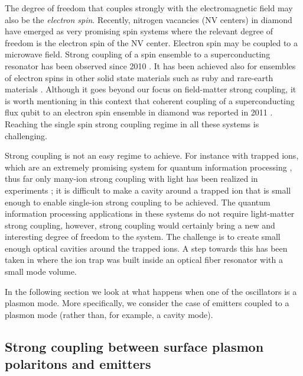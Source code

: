 \documentclass[12pt]{iopart}
\begin{document}
The degree of freedom that couples strongly with the electromagnetic field may also be the {\it electron spin}. Recently, nitrogen vacancies (NV centers) in diamond have emerged as very promising spin systems where the relevant degree of freedom is the electron spin of the NV center. Electron spin may be coupled to a microwave field. Strong coupling of a spin ensemble to a superconducting resonator has been observed since 2010 \cite{Kubo2010,Amsuss2011}. It has been achieved also for ensembles of electron spins in other solid state materials such as ruby \cite{Schuster2010} and rare-earth materials \cite{Probst2013}. Although it goes beyond our focus on field-matter strong coupling, it is worth mentioning in this context that coherent coupling of a superconducting flux qubit to an electron spin ensemble in diamond was reported in 2011 \cite{Zhu2011}. Reaching the single spin strong coupling regime in all these systems is challenging.

Strong coupling is not an easy regime to achieve. For instance with trapped ions, which are an extremely promising system for quantum information processing \cite{Cirac1995,Monroe1995,Schmidt-Kaler2003,Leibfried2003}, thus far only many-ion strong coupling with light has been realized in experiments \cite{Herskind2009}; it is difficult to make a cavity around a trapped ion that is small enough to enable single-ion strong coupling to be achieved. The quantum information processing applications in these systems do not require light-matter strong coupling, however, strong coupling would certainly bring a new and interesting degree of freedom to the system. The challenge is to create small enough optical cavities around the trapped ions. A step towards this has been taken in \cite{Steiner2013} where the ion trap was built inside an optical fiber resonator with a small mode volume. 
 
In the following section we look at what happens when one of the oscillators is a plasmon mode. More specifically, we consider the case of emitters coupled to a plasmon mode (rather than, for example, a cavity mode).

\subsection{Strong coupling between surface plasmon polaritons and emitters} 
\label{sppstrongcouplingbriefly}
\end{document}
